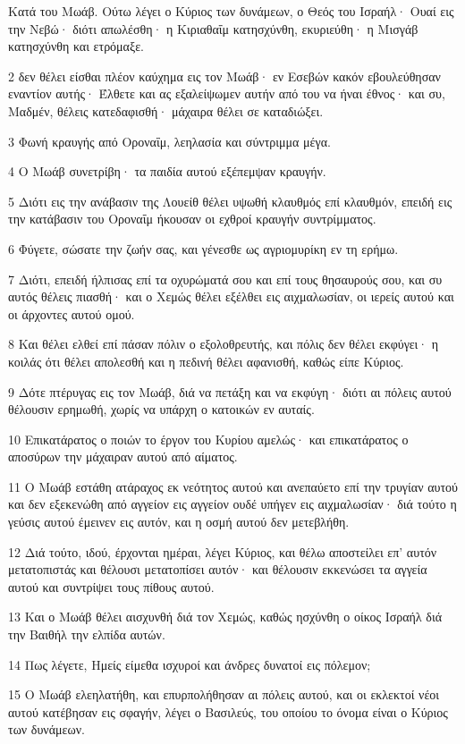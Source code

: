 \par Κατά του Μωάβ. Ούτω λέγει ο Κύριος των δυνάμεων, ο Θεός του Ισραήλ· Ουαί εις την Νεβώ· διότι απωλέσθη· η Κιριαθαΐμ κατησχύνθη, εκυριεύθη· η Μισγάβ κατησχύνθη και ετρόμαξε.
\par 2 δεν θέλει είσθαι πλέον καύχημα εις τον Μωάβ· εν Εσεβών κακόν εβουλεύθησαν εναντίον αυτής· Έλθετε και ας εξαλείψωμεν αυτήν από του να ήναι έθνος· και συ, Μαδμέν, θέλεις κατεδαφισθή· μάχαιρα θέλει σε καταδιώξει.
\par 3 Φωνή κραυγής από Οροναΐμ, λεηλασία και σύντριμμα μέγα.
\par 4 Ο Μωάβ συνετρίβη· τα παιδία αυτού εξέπεμψαν κραυγήν.
\par 5 Διότι εις την ανάβασιν της Λουείθ θέλει υψωθή κλαυθμός επί κλαυθμόν, επειδή εις την κατάβασιν του Οροναΐμ ήκουσαν οι εχθροί κραυγήν συντρίμματος.
\par 6 Φύγετε, σώσατε την ζωήν σας, και γένεσθε ως αγριομυρίκη εν τη ερήμω.
\par 7 Διότι, επειδή ήλπισας επί τα οχυρώματά σου και επί τους θησαυρούς σου, και συ αυτός θέλεις πιασθή· και ο Χεμώς θέλει εξέλθει εις αιχμαλωσίαν, οι ιερείς αυτού και οι άρχοντες αυτού ομού.
\par 8 Και θέλει ελθεί επί πάσαν πόλιν ο εξολοθρευτής, και πόλις δεν θέλει εκφύγει· η κοιλάς ότι θέλει απολεσθή και η πεδινή θέλει αφανισθή, καθώς είπε Κύριος.
\par 9 Δότε πτέρυγας εις τον Μωάβ, διά να πετάξη και να εκφύγη· διότι αι πόλεις αυτού θέλουσιν ερημωθή, χωρίς να υπάρχη ο κατοικών εν αυταίς.
\par 10 Επικατάρατος ο ποιών το έργον του Κυρίου αμελώς· και επικατάρατος ο αποσύρων την μάχαιραν αυτού από αίματος.
\par 11 Ο Μωάβ εστάθη ατάραχος εκ νεότητος αυτού και ανεπαύετο επί την τρυγίαν αυτού και δεν εξεκενώθη από αγγείον εις αγγείον ουδέ υπήγεν εις αιχμαλωσίαν· διά τούτο η γεύσις αυτού έμεινεν εις αυτόν, και η οσμή αυτού δεν μετεβλήθη.
\par 12 Διά τούτο, ιδού, έρχονται ημέραι, λέγει Κύριος, και θέλω αποστείλει επ' αυτόν μετατοπιστάς και θέλουσι μετατοπίσει αυτόν· και θέλουσιν εκκενώσει τα αγγεία αυτού και συντρίψει τους πίθους αυτού.
\par 13 Και ο Μωάβ θέλει αισχυνθή διά τον Χεμώς, καθώς ησχύνθη ο οίκος Ισραήλ διά την Βαιθήλ την ελπίδα αυτών.
\par 14 Πως λέγετε, Ημείς είμεθα ισχυροί και άνδρες δυνατοί εις πόλεμον;
\par 15 Ο Μωάβ ελεηλατήθη, και επυρπολήθησαν αι πόλεις αυτού, και οι εκλεκτοί νέοι αυτού κατέβησαν εις σφαγήν, λέγει ο Βασιλεύς, του οποίου το όνομα είναι ο Κύριος των δυνάμεων.

